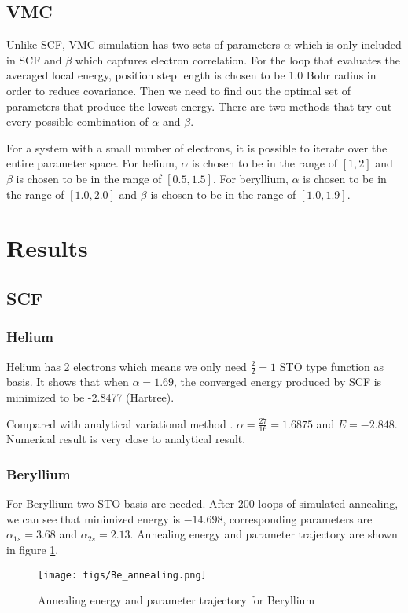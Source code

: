 \documentclass[11pt]{article}
\begin{document}
\subsection{VMC}
Unlike SCF, VMC simulation has two sets of parameters $\alpha$ which is only included in SCF and $\beta$ which captures electron correlation. For the loop that evaluates the averaged local energy, position step length is chosen to be 1.0 Bohr radius in order to reduce covariance. Then we need to find out the optimal set of parameters that produce the lowest energy. There are two methods that try out every possible combination of $\alpha$ and $\beta$. 

For a system with a small number of electrons, it is possible to iterate over the entire parameter space. For helium, $\alpha$ is chosen to be in the range of $[1, 2]$ and $\beta$ is chosen to be in the range of $[0.5, 1.5]$. For beryllium, $\alpha$ is chosen to be in the range of $[1.0, 2.0]$ and $\beta$ is chosen to be in the range of $[1.0, 1.9]$.

\section{Results}
\subsection{SCF}
\subsubsection*{Helium}
Helium has 2 electrons which means we only need $\frac{2}{2}=1$ STO type function as basis. It shows that when $\alpha=1.69$, the converged energy produced by SCF is minimized to be -2.8477 (Hartree). 

Compared with analytical variational method \cite{analytical_variatonal_He}. $\alpha=\frac{27}{16} = 1.6875$ and $E=-2.848$. Numerical result is very close to analytical result. 

\subsubsection*{Beryllium}
For Beryllium two STO basis are needed. After 200 loops of simulated annealing, we can see that minimized energy is $-14.698$, corresponding parameters are $\alpha_{1s}=3.68$ and $\alpha_{2s}=2.13$. Annealing energy and parameter trajectory are shown in figure \ref{fig:be-scf-annealing}.
\begin{figure}
    \centering
    \texttt{[image: figs/Be\_annealing.png]}
    \caption{Annealing energy and parameter trajectory for Beryllium}
    \label{fig:be-scf-annealing}%
\end{figure}
\end{document}

